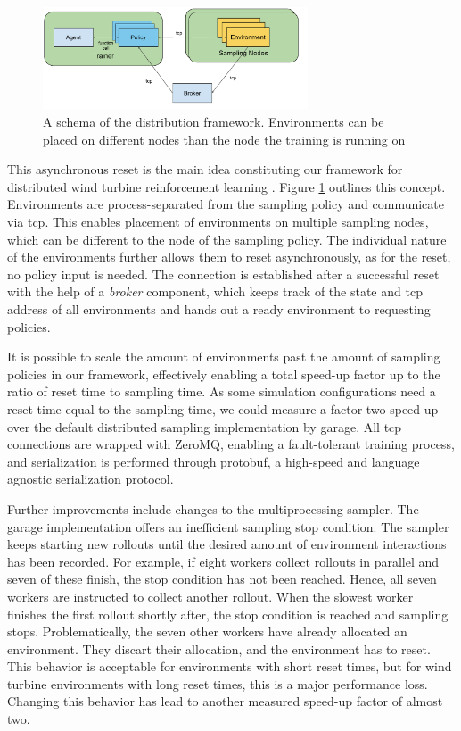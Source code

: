 \begin{figure}
  \centering
  \includegraphics[width=0.7\textwidth]{images/Distributed-QBlade.pdf}
  \caption{A schema of the distribution framework. Environments can be placed on different nodes than the node the training is running on}
  \label{fig:distributed-framework}
\end{figure}

This asynchronous reset is the main idea constituting our framework for distributed wind turbine reinforcement learning \cite{westerbeckFrameworkDistributedWind2021}. Figure \ref{fig:distributed-framework} outlines this concept. Environments are process-separated from the sampling policy and communicate via tcp. This enables placement of environments on multiple sampling nodes, which can be different to the node of the sampling policy. The individual nature of the environments further allows them to reset asynchronously, as for the reset, no policy input is needed. The connection is established after a successful reset with the help of a \textit{broker} component, which keeps track of the state and tcp address of all environments and hands out a ready environment to requesting policies. 

It is possible to scale the amount of environments past the amount of sampling policies in our framework, effectively enabling a total speed-up factor up to the ratio of reset time to sampling time. As some simulation configurations need a reset time equal to the sampling time, we could measure a factor two speed-up over the default distributed sampling implementation by garage. All tcp connections are wrapped with ZeroMQ, enabling a fault-tolerant training process, and serialization is performed through protobuf, a high-speed and language agnostic serialization protocol.

Further improvements include changes to the multiprocessing sampler. The garage implementation offers an inefficient sampling stop condition. The sampler keeps starting new rollouts until the desired amount of environment interactions has been recorded. For example, if eight workers collect rollouts in parallel and seven of these finish, the stop condition has not been reached. Hence, all seven workers are instructed to collect another rollout. When the slowest worker finishes the first rollout shortly after, the stop condition is reached and sampling stops. Problematically, the seven other workers have already allocated an environment. They discart their allocation, and the environment has to reset. This behavior is acceptable for environments with short reset times, but for wind turbine environments with long reset times, this is a major performance loss. Changing this behavior has lead to another measured speed-up factor of almost two.


